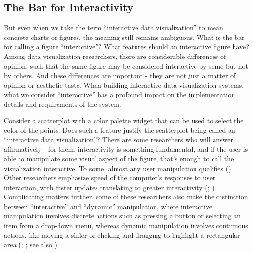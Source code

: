 \documentclass[
]{book}
\theoremstyle{definition}
\theoremstyle{definition}
\theoremstyle{definition}
\theoremstyle{definition}
\theoremstyle{remark}
\begin{document}
\subsection{The Bar for Interactivity}\label{the-bar-for-interactivity}

But even when we take the term ``interactive data visualization'' to mean concrete charts or figures, the meaning still remains ambiguous. What is the bar for calling a figure ``interactive''? What features should an interactive figure have? Among data visualization researchers, there are considerable differences of opinion, such that the same figure may be considered interactive by some but not by others. And these differences are important - they are not just a matter of opinion or aesthetic taste. When building interactive data visualization systems, what we consider ``interactive'' has a profound impact on the implementation details and requirements of the system.

Consider a scatterplot with a color palette widget that can be used to select the color of the points. Does such a feature justify the scatterplot being called an ``interactive data visualization''? There are some researchers who will answer affirmatively - for them, interactivity is something fundamental, and if the user is able to manipulate some visual aspect of the figure, that's enough to call the visualization interactive. To some, almost any user manipulation qualifies (). Other researchers emphasize speed of the computer's responses to user interaction, with faster updates translating to greater interactivity (; ). Complicating matters further, some of these researchers also make the distinction between ``interactive'' and ``dynamic'' manipulation, where interactive manipulation involves discrete actions such as pressing a button or selecting an item from a drop-down menu, whereas dynamic manipulation involves continuous actions, like moving a slider or clicking-and-dragging to highlight a rectangular area (; ; see also ).
\end{document}
